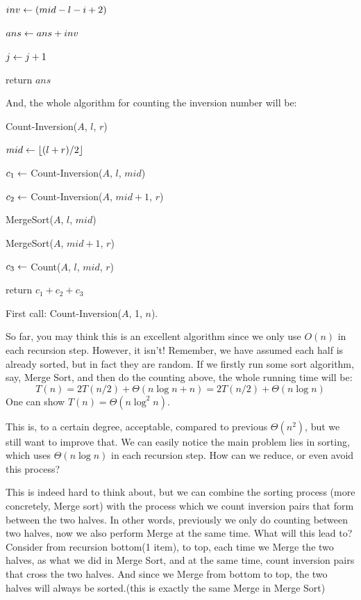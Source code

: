 \documentclass[11pt, a4paper]{COMP3711}
\begin{document}
\begin{spacing}{1.5}
\begin{algorithm}
{{                


                $inv\leftarrow (mid-l-i+2)$

                $ans\leftarrow ans+inv$

                $j\leftarrow j+1$
            }
        }
        return $ans$
    \end{algorithm}

    And, the whole algorithm for counting the inversion number will be:

    \begin{algorithm}
        \caption{Count-Inversion($A$, $l$, $r$)}
        $mid \leftarrow \lfloor (l+r)/2 \rfloor$

        $c_1\leftarrow$ Count-Inversion($A$, $l$, $mid$)

        $c_2\leftarrow$ Count-Inversion($A$, $mid+1$, $r$)

        MergeSort($A$, $l$, $mid$) 

        MergeSort($A$, $mid+1$, $r$) 

        $c_3\leftarrow$ Count($A$, $l$, $mid$, $r$)

        return $c_1+c_2+c_3$
    \end{algorithm}

    First call: Count-Inversion($A$, 1, $n$).

    So far, you may think this is an excellent algorithm since we 
    only use $O(n)$ in each recursion step. However, it isn't! 
    Remember, we have assumed each half is already sorted, but in fact 
    they are random. If we firstly run some sort algorithm, say, 
    Merge Sort, and then do the counting above, the whole 
    running time will be:
    $$T(n)=2T(n/2)+\Theta (n\log n+n)=2T(n/2)+\Theta (n\log n)$$
    One can show $T(n)=\Theta(n\log^2 n)$.

    This is, to a certain degree, acceptable, compared to previous $\Theta(n^2)$,
    but we still want to improve that. 
    We can easily notice the main problem lies in sorting, which 
    uses $\Theta(n\log n)$ in each recursion step. How can we 
    reduce, or even avoid this process? 

    This is indeed hard to think about, but we can combine the sorting process 
    (more concretely, Merge sort)
    with the process which we count inversion pairs that form between the 
    two halves. In other words, previously we only do counting between 
    two halves, now we also perform Merge at the same time.
    What will this lead to? Consider from recursion bottom(1 item), 
    to top, each time we Merge the two halves, as what we did in 
    Merge Sort, and at the same time, count inversion pairs that cross 
    the two halves. And since we Merge from bottom to top, 
    the two halves will always be sorted.(this is exactly the same 
    Merge in Merge Sort)


\end{spacing}
\end{document}
